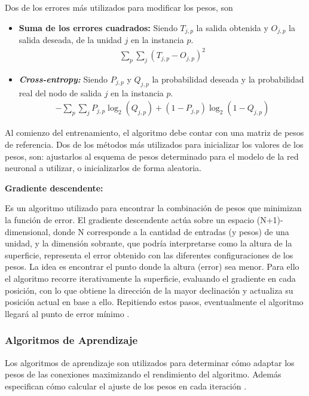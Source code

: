 Dos de los errores más utilizados para modificar los pesos, son
\begin{itemize}
    \item \textbf{Suma de los errores cuadrados:} Siendo $T_{j,p}$ la salida obtenida y $O_{j,p}$ la salida deseada, de la unidad $j$ en la instancia $p$.
    \begin{align*}
    \sum_p \sum_j (T_{j,p} - O_{j,p})^2
    \end{align*}
    \item \textbf{\emph{Cross-entropy:}}  Siendo $P_{j,p}$ y $Q_{j,p}$ la probabilidad deseada y la probabilidad real del nodo de salida $j$ en la instancia $p$.
    \begin{align*}
    - \sum_p \sum_j P_{j,p}\log_2(Q_{j,p})+(1-P_{j,p})\log_2(1-Q_{j,p})
    \end{align*}
\end{itemize}
%
Al comienzo del entrenamiento, el algoritmo debe contar con una matriz de pesos de referencia. Dos de los métodos más utilizados para inicializar los valores de los pesos, son: ajustarlos al esquema de pesos determinado para el modelo de la red neuronal a utilizar, o inicializarlos de forma aleatoria.
%

\textbf{Gradiente descendente:}

Es un algoritmo utilizado para encontrar la combinación de pesos que minimizan la función de error. El gradiente descendente actúa sobre un espacio (N+1)-dimensional, donde N corresponde a la cantidad de entradas (y pesos) de una unidad, y la dimensión sobrante, que podría interpretarse como la altura de la superficie, representa el error obtenido con las diferentes configuraciones de los pesos. La idea es encontrar el punto donde la altura (error) sea menor. Para ello el algoritmo recorre iterativamente la superficie, evaluando el gradiente en cada posición, con lo que obtiene la dirección de la mayor declinación y actualiza su posición actual en base a ello. Repitiendo estos pasos, eventualmente el algoritmo llegará al punto de error mínimo \cite{Buduma}.

%
\subsubsection{Algoritmos de Aprendizaje}

Los algoritmos de aprendizaje son utilizados para determinar cómo adaptar los pesos de las conexiones maximizando el rendimiento del algoritmo. Además especifican cómo calcular el ajuste de los pesos en cada iteración \cite{Fu}.

